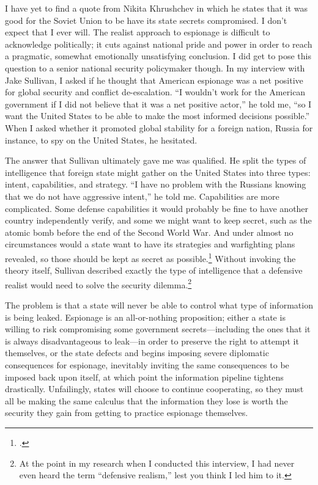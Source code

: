\documentclass{memoir}
\begin{document}
\begin{refsegment}
I have yet to find a quote from Nikita Khrushchev in which he states that it was good for the Soviet Union to be have its state secrets compromised. I don't expect that I ever will. The realist approach to espionage is difficult to acknowledge politically; it cuts against national pride and power in order to reach a pragmatic, somewhat emotionally unsatisfying conclusion. I did get to pose this question to a senior national security policymaker though. In my interview with Jake Sullivan, I asked if he thought that American espionage was a net positive for global security and conflict de-escalation. ``I wouldn't work for the American government if I did not believe that it was a net positive actor,'' he told me, ``so I want the United States to be able to make the most informed decisions possible.'' When I asked whether it promoted global stability for a foreign nation, Russia for instance, to spy on the United States, he hesitated.

The answer that Sullivan ultimately gave me was qualified. He split the types of intelligence that foreign state might gather on the United States into three types: intent, capabilities, and strategy. ``I have no problem with the Russians knowing that we do not have aggressive intent,'' he told me. Capabilities are more complicated. Some defense capabilities it would probably be fine to have another country independently verify, and some we might want to keep secret, such as the atomic bomb before the end of the Second World War. And under almost no circumstances would a state want to have its strategies and warfighting plans revealed, so those should be kept as secret as possible.\footcite{sullivan_personal_2019} Without invoking the theory itself, Sullivan described exactly the type of intelligence that a defensive realist would need to solve the security dilemma.\footnote{At the point in my research when I conducted this interview, I had never even heard the term ``defensive realism,'' lest you think I led him to it.}

The problem is that a state will never be able to control what type of information is being leaked. Espionage is an all-or-nothing proposition; either a state is willing to risk compromising some government secrets---including the ones that it is always disadvantageous to leak---in order to preserve the right to attempt it themselves, or the state defects and begins imposing severe diplomatic consequences for espionage, inevitably inviting the same consequences to be imposed back upon itself, at which point the information pipeline tightens drastically. Unfailingly, states will choose to continue cooperating, so they must all be making the same calculus that the information they lose is worth the security they gain from getting to practice espionage themselves.


\end{refsegment}
\end{document}
